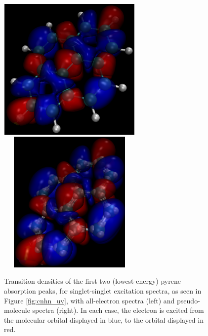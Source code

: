 \documentclass[12pt]{article}
\begin{document}
\begin{figure}
\begin{center}
\vspace{5mm}
\includegraphics[width=7cm, height=7cm]{pyrene_2nd_peak.png}
\includegraphics[width=7cm, height=7cm]{ps_pyrene_2nd_peak.png}
\end{center}
\caption{Transition densities of the first two (lowest-energy) pyrene absorption peaks, for singlet-singlet excitation spectra, as seen in Figure \ref{fig:cnhn_uv}, with all-electron spectra (left) and pseudo-molecule spectra (right). In each case, the electron is excited from the molecular orbital displayed in blue, to the orbital displayed in red.}
\label{fig:transitiondensities}
\end{figure}

\clearpage
\end{document}
